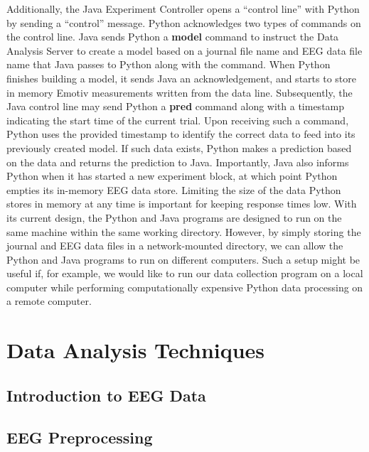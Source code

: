 \documentclass[11pt]{report}
\begin{document}
	Additionally, the Java Experiment Controller opens a ``control line'' with Python by sending a ``control'' message.  Python acknowledges two types of commands on the control line.  Java sends Python a {\bf model} command to instruct the Data Analysis Server to create a model based on a journal file name and EEG data file name that Java passes to Python along with the command.  When Python finishes building a model, it sends Java an acknowledgement, and starts to store in memory Emotiv measurements written from the data line.  Subsequently, the Java control line may send Python a {\bf pred} command along with a timestamp indicating the start time of the current trial.  Upon receiving such a command, Python uses the provided timestamp to identify the correct data to feed into its previously created model.  If such data exists, Python makes a prediction based on the data and returns the prediction to Java.  Importantly, Java also informs Python when it has started a new experiment block, at which point Python empties its in-memory EEG data store.  Limiting the size of the data Python stores in memory at any time is important for keeping response times low.  
	With its current design, the Python and Java programs are designed to run on the same machine within the same working directory.  However, by simply storing the journal and EEG data files in a network-mounted directory, we can allow the Python and Java programs to run on different computers.  Such a setup might be useful if, for example, we would like to run our data collection program on a local computer while performing computationally expensive Python data processing on a remote computer.


\section{Data Analysis Techniques}

\subsection{Introduction to EEG Data}
\subsection{EEG Preprocessing}
\end{document}
